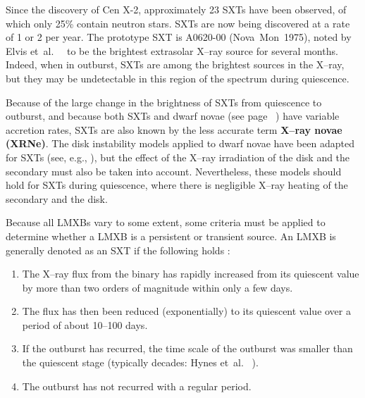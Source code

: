 \vspace{\myparskip}

Since the discovery of Cen X-2, approximately 23 SXTs have been
observed, of which only 25\% contain neutron stars. SXTs are now being
discovered at a rate of 1 or 2 per year. The prototype SXT is A0620-00
(\mbox{Nova Mon 1975}), noted by Elvis et~al.\ %
\citeyear{Elvis_et_al.:1975}%
\ to be the brightest extrasolar X--ray source for several months. %
Indeed, when in outburst, SXTs are among the brightest sources in the X--ray, but they may be undetectable in this region of the spectrum during quiescence. %

\vspace{\myparskip}

Because of the large change in the brightness of SXTs from quiescence
to outburst, and because both SXTs and dwarf novae (see page~%
\pageref{cha:Introduction:sec:X--rayBinaries:subsec:CompactObjects:topic:DwarfNovae}%
) have variable accretion rates, SXTs are also known by the less accurate term \textbf{X--ray novae
(XRNe)}. The disk instability models applied to dwarf novae have been adapted for
SXTs (see, e.g., %
%
), but the effect of the X--ray irradiation of the disk and the secondary must
also be taken into account. Nevertheless, these models should hold for SXTs during quiescence,
where there is negligible X--ray heating of the secondary and the
disk. %

\vspace{\myparskip}


Because all LMXBs vary to some extent, some criteria must be applied to determine whether a LMXB is a persistent or transient source. An LMXB is generally denoted as an SXT if the following holds %
\cite{TanakaShibazaki:1996}:
\begin{enumerate}
\item\label{cha:Introduction:sec:X--rayBinaries:subsec:CriteriaForSXTs:enu:flux}
The X--ray flux from the binary has rapidly increased from its quiescent
value by more than two orders of magnitude within only a few days.
\item\label{cha:Introduction:sec:X--rayBinaries:subsec:CriteriaForSXTs:enu:reduction}
The flux has then been reduced (exponentially) to its quiescent value
over a period of about 10--100 days.
\item\label{cha:Introduction:sec:X--rayBinaries:subsec:CriteriaForSXTs:enu:outburst}
If the outburst has recurred, the time scale of the outburst was
smaller than the quiescent stage (typically decades: Hynes et~al.\ %
). %
\item\label{cha:Introduction:sec:X--rayBinaries:subsec:CriteriaForSXTs:enu:recur}
The outburst has not recurred with a regular period.
\end{enumerate}

